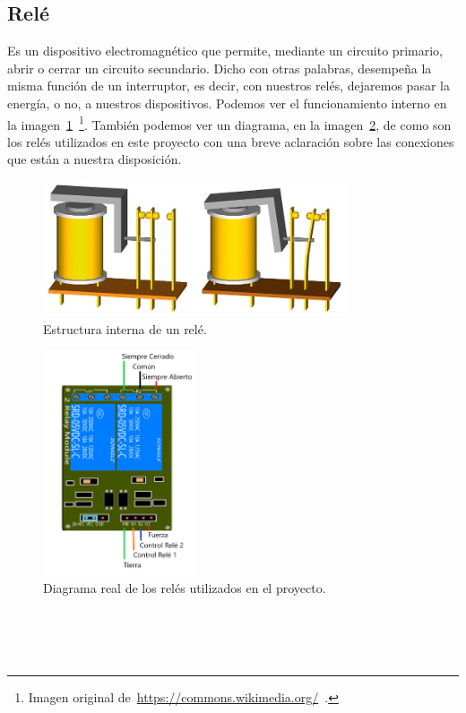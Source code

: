 \subsection{Relé}\label{4:Relé}
Es un dispositivo electromagnético que permite, mediante un circuito primario, abrir o cerrar un circuito secundario. Dicho con otras palabras, desempeña la misma función de un interruptor, es decir, con nuestros relés, dejaremos pasar la energía, o no, a nuestros dispositivos. Podemos ver el funcionamiento interno en la imagen~\ref{Img:Rele1}~\footnote{Imagen original de~\url{https://commons.wikimedia.org/}~.}. También podemos ver un diagrama, en la imagen~\ref{Img:ReleProyecto}, de como son los relés utilizados en este proyecto con una breve aclaración sobre las conexiones que están a nuestra disposición.
\begin{figure}[h]
    \centering
    \includegraphics[width=0.8\textwidth]{img/Rele_1.jpg}
    \caption{Estructura interna de un relé.} \label{Img:Rele1}
\end{figure}
\begin{figure}[h]
    \centering
    \includegraphics[width=0.4\textwidth]{img/Diagramas/ReleProyecto.png}
    \caption{Diagrama real de los relés utilizados en el proyecto.} \label{Img:ReleProyecto}
\end{figure}
~\\~\\~\\


